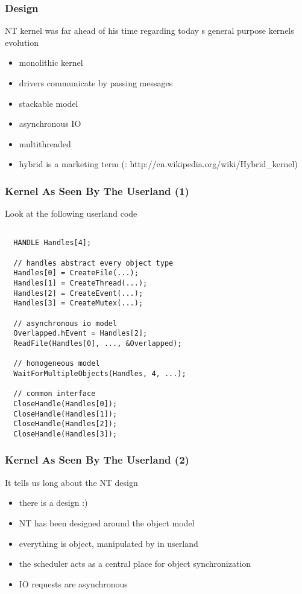 \begin{frame}
  \frametitle{Design}

  NT kernel was far ahead of his time regarding today s general purpose kernels evolution

  \begin{itemize}
    \item
      monolithic kernel
    \item
      drivers communicate by passing messages
    \item
      stackable model
    \item
      asynchronous IO
    \item
      multithreaded
    \item
      hybrid is a marketing term (: http://en.wikipedia.org/wiki/Hybrid\_kernel)
  \end{itemize}

\end{frame}


\begin{frame}[containsverbatim]
  \frametitle{Kernel As Seen By The Userland (1)}
   
  Look at the following userland code

  \begin{verbatim}

  HANDLE Handles[4];

  // handles abstract every object type
  Handles[0] = CreateFile(...);
  Handles[1] = CreateThread(...);
  Handles[2] = CreateEvent(...);
  Handles[3] = CreateMutex(...);

  // asynchronous io model
  Overlapped.hEvent = Handles[2];
  ReadFile(Handles[0], ..., &Overlapped);

  // homogeneous model
  WaitForMultipleObjects(Handles, 4, ...);

  // common interface
  CloseHandle(Handles[0]);
  CloseHandle(Handles[1]);
  CloseHandle(Handles[2]);
  CloseHandle(Handles[3]);

  \end{verbatim}
  
\end{frame}

\begin{frame}
  \frametitle{Kernel As Seen By The Userland (2)}

 It tells us long about the NT design

 \begin{itemize}
   \item
     there is a design :)
   \item
     NT has been designed around the object model
   \item
     everything is object, manipulated by  in userland
   \item
     the scheduler acts as a central place for object synchronization
   \item
     IO requests are asynchronous
 \end{itemize}

\end{frame}


